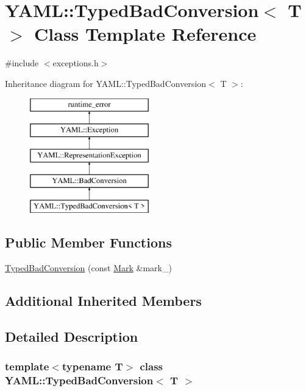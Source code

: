 \hypertarget{class_y_a_m_l_1_1_typed_bad_conversion}{}\section{Y\+A\+ML\+::Typed\+Bad\+Conversion$<$ T $>$ Class Template Reference}
\label{class_y_a_m_l_1_1_typed_bad_conversion}


{\ttfamily \#include $<$exceptions.\+h$>$}

Inheritance diagram for Y\+A\+ML\+::Typed\+Bad\+Conversion$<$ T $>$\+:\begin{figure}[H]
\begin{center}
\leavevmode
\includegraphics[height=5.000000cm]{class_y_a_m_l_1_1_typed_bad_conversion}
\end{center}
\end{figure}
\subsection*{Public Member Functions}
\begin{DoxyCompactItemize}
\item 
\mbox{\hyperlink{class_y_a_m_l_1_1_typed_bad_conversion_a638e002c83e6df499b700367dae3d776}{Typed\+Bad\+Conversion}} (const \mbox{\hyperlink{struct_y_a_m_l_1_1_mark}{Mark}} \&mark\+\_\+)
\end{DoxyCompactItemize}
\subsection*{Additional Inherited Members}


\subsection{Detailed Description}
\subsubsection*{template$<$typename T$>$\newline
class Y\+A\+M\+L\+::\+Typed\+Bad\+Conversion$<$ T $>$}



